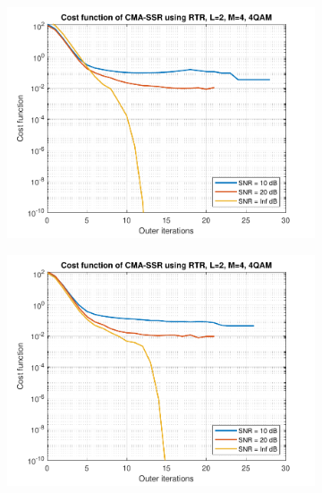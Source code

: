 \begin{figure}
	\centering
	\begin{subfigure}[b]{0.45\textwidth}
		\includegraphics[width=\linewidth]{./figs/BF_RTR_cost_4QAM_L=2_M=4_K=200.pdf}
		\label{fig:rtr_cost200}
	\end{subfigure}
	\begin{subfigure}[b]{0.45\textwidth}
		\includegraphics[width=\linewidth]{./figs/BF_RTR_cost_4QAM_L=2_M=4_K=1000.pdf}
		\label{fig:rtr_cost1000}
	\end{subfigure}\\
	\begin{subfigure}[b]{0.45\textwidth}

\end{subfigure}
\end{figure}
